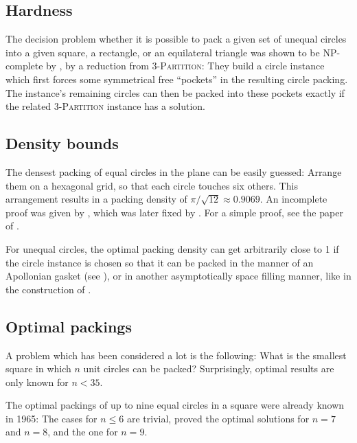 \documentclass[a4paper,style=print,oneside,bibliography=totoc,nexus,lnum,extramargin]{tubsbook}
\begin{document}
\subsection{Hardness}

The decision problem whether it is possible to pack a given set of unequal circles into a given square, a rectangle, or an equilateral triangle was shown to be NP-complete by \textcite{DFL2010circle}, by a reduction from \textsc{3-Partition}: They build a circle instance which first forces some symmetrical free “pockets” in the resulting circle packing. The instance's remaining circles can then be packed into these pockets exactly if the related \textsc{3-Partition} instance has a solution.

\subsection{Density bounds}

The densest packing of equal circles in the plane can be easily guessed: Arrange them on a hexagonal grid, so that each circle touches six others. This arrangement results in a packing density of $\pi/\sqrt{12} \approx 0.9069$. An incomplete proof was given by \textcite{thue1892om}, which was later fixed by \textcite{fejestoth1940uber}. For a simple proof, see the paper of \textcite{CW2010simple}.

For unequal circles, the optimal packing density can get arbitrarily close to 1 if the circle instance is chosen so that it can be packed in the manner of an Apollonian gasket (see ), or in another asymptotically space filling manner, like in the construction of \textcite{bourke2011random}.


\subsection{Optimal packings}

A problem which has been considered a lot is the following: What is the smallest square in which $n$ unit circles can be packed?
Surprisingly, optimal results are only known for $n < 35$.

The optimal packings of up to nine equal circles in a square were already known in 1965: The cases for $n \le 6$ are trivial,
\textcite{schaer1965densest} proved the optimal solutions for $n = 7$ and $n = 8$, and \textcite{SM1965geometric} the one for $n = 9$.
\end{document}
